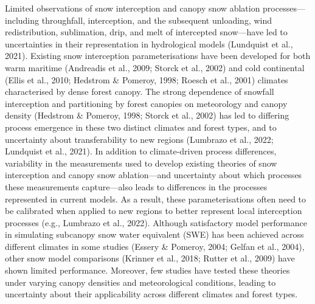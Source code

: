 \documentclass[
  letterpaper,
]{tex/uofsthesis-cs}
\begin{document}
Limited observations of snow interception and canopy snow ablation
processes---including throughfall, interception, and the subsequent
unloading, wind redistribution, sublimation, drip, and melt of
intercepted snow---have led to uncertainties in their representation in
hydrological models (Lundquist et al., 2021). Existing snow interception
parameterisations have been developed for both warm maritime (Andreadis
et al., 2009; Storck et al., 2002) and cold continental (Ellis et al.,
2010; Hedstrom \& Pomeroy, 1998; Roesch et al., 2001) climates
characterised by dense forest canopy. The strong dependence of snowfall
interception and partitioning by forest canopies on meteorology and
canopy density (Hedstrom \& Pomeroy, 1998; Storck et al., 2002) has led
to differing process emergence in these two distinct climates and forest
types, and to uncertainty about transferability to new regions (Lumbrazo
et al., 2022; Lundquist et al., 2021). In addition to climate-driven
process differences, variability in the measurements used to develop
existing theories of snow interception and canopy snow ablation---and
uncertainty about which processes these measurements capture---also
leads to differences in the processes represented in current models. As
a result, these parameterisations often need to be calibrated when
applied to new regions to better represent local interception processes
(e.g., Lumbrazo et al., 2022). Although satisfactory model performance
in simulating subcanopy snow water equivalent (SWE) has been achieved
across different climates in some studies (Essery \& Pomeroy, 2004;
Gelfan et al., 2004), other snow model comparisons (Krinner et al.,
2018; Rutter et al., 2009) have shown limited performance. Moreover, few
studies have tested these theories under varying canopy densities and
meteorological conditions, leading to uncertainty about their
applicability across different climates and forest types.
\end{document}
